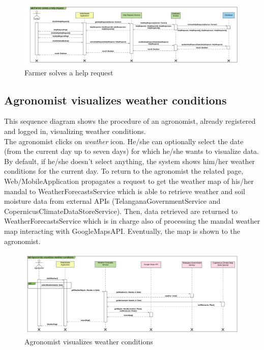\newpage
\begin{landscape}
\begin{figure}[t!]
\vspace*{2cm}
\noindent
\centering
\centerline{\includegraphics[scale= 0.108]{./Images/Sequence diagram/Farmer solves a help request.png}}
    \caption {Farmer solves a help request}
    \vspace*{-12cm}
\end{figure}
\fillandplacepagenumber
\end{landscape}

\subsection{Agronomist visualizes weather conditions}

This sequence diagram shows the procedure of an agronomist, already registered and logged in, visualizing weather conditions.\\
The agronomist clicks on \textit{weather} icon.
He/she can optionally select the date (from the current day up to seven days) for which he/she wants to visualize data. By default, if he/she doesn't select anything, the system shows him/her weather conditions for the current day. To return to the agronomist the related page, Web/MobileApplication propagates a request to get the weather map of his/her mandal to WeatherForecastsService which is able to retrieve weather and soil moisture data from external APIs (TelanganaGovernmentService and CopernicusClimateDataStoreService).
Then, data retrieved are returned to WeatherForecastsService which is in charge also of processing the mandal weather map interacting with GoogleMapsAPI.  
Eventually, the map is shown to the agronomist.

\newpage
\begin{landscape}
\begin{figure}[t!]
\vspace*{1.5cm}
\noindent
\centering
\centerline{\includegraphics[scale= 0.108]{./Images/Sequence diagram/Agronomist visualizes weather conditions.png}}
    \caption{Agronomist visualizes weather conditions}
    \vspace*{-12cm}
\end{figure}
\fillandplacepagenumber
\end{landscape}

